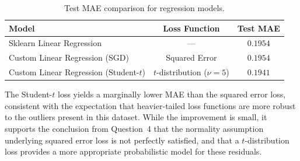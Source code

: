 \documentclass[11pt]{article}
\begin{document}
\begin{table}[h]
    \centering
    \caption{Test MAE comparison for regression models.}
    \label{tab:regression}
    \begin{tabular}{lcc}
        \toprule
        \textbf{Model} & \textbf{Loss Function} & \textbf{Test MAE} \\
        \midrule
        Sklearn Linear Regression          & ---                   & $0.1954$ \\
        Custom Linear Regression (SGD)     & Squared Error         & $0.1954$ \\
        Custom Linear Regression (Student-$t$) & $t$-distribution ($\nu=5$) & $0.1941$ \\
        \bottomrule
    \end{tabular}
\end{table}

The Student-$t$ loss yields a marginally lower MAE than the squared error loss,
consistent with the expectation that heavier-tailed loss functions are more
robust to the outliers present in this dataset. While the improvement is small,
it supports the conclusion from Question~4 that the normality assumption
underlying squared error loss is not perfectly satisfied, and that a
$t$-distribution loss provides a more appropriate probabilistic model for
these residuals.
\end{document}
